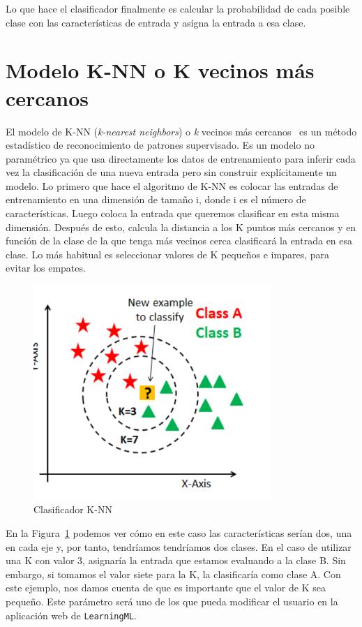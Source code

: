 \documentclass[a4paper, 12pt]{book}
\begin{document}
Lo que hace el clasificador finalmente es calcular la probabilidad de cada posible clase con las características de entrada y asigna la entrada a esa clase.

\section{Modelo K-NN o K vecinos más cercanos} 
\label{sec:modeloknn}

El modelo de K-NN (\emph{k-nearest neighbors}) o \emph{k} vecinos más cercanos~\cite{knn1,knn2} es un método estadístico de reconocimiento de patrones supervisado. Es un modelo no paramétrico ya que usa directamente los datos de entrenamiento para inferir cada vez la clasificación de una nueva entrada pero sin construir explícitamente un modelo. Lo primero que hace el algoritmo de K-NN es colocar las entradas de entrenamiento en una dimensión de tamaño i, donde i es el número de características. Luego coloca la entrada que queremos clasificar en esta misma dimensión. Después de esto, calcula la distancia a los K puntos más cercanos y en función de la clase de la que tenga más vecinos cerca clasificará la entrada en esa clase. Lo más habitual es seleccionar valores de K pequeños e impares, para evitar los empates. 

\begin{figure}
	\centering
	\includegraphics[width=9cm, keepaspectratio]{img/knn}
	\caption{Clasificador K-NN}\label{fig:knn}
\end{figure}


En la Figura~\ref{fig:knn} podemos ver cómo en este caso las características serían dos, una en cada eje y, por tanto, tendríamos tendríamos dos clases. En el caso de utilizar una K con valor 3, asignaría la entrada que estamos evaluando a la clase B. Sin embargo, si tomamos el valor siete para la K, la clasificaría como clase A. Con este ejemplo, nos damos cuenta de que es importante que el valor de K sea pequeño. Este parámetro será uno de los que pueda modificar el usuario en la aplicación web de \texttt{LearningML}.
\end{document}
